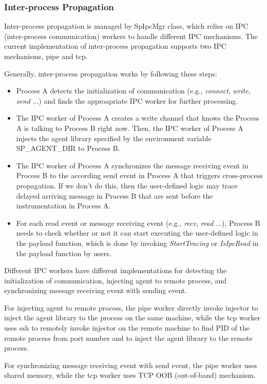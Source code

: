 \subsubsection{Inter-process Propagation}
Inter-process propagation is managed by SpIpcMgr class, which relies on IPC
(inter-process communication) workers to handle different IPC mechanisms.  The
current implementation of inter-process propagation supports two IPC mechanisms,
pipe and tcp.

Generally, inter-process propagation works by following these steps:
\begin{itemize}
\item Process A detects the initialization of communication (e.g., {\em
    connect}, {\em write}, {\em send} ...) and finds the approapriate IPC worker
  for further processing.
\item The IPC worker of Process A creates a write channel that knows the Process
  A is talking to Process B right now. Then, the IPC worker of Process A injects
  the agent library specified by the environment variable SP\_AGENT\_DIR to
  Process B.
\item The IPC worker of Process A synchronizes the message receiving event in
  Process B to the according send event in Process A that triggers cross-process
  propagation. If we don't do this, then the user-defined logic may trace
  delayed arriving message in Process B that are sent before the instrumentation
  in Process A.
\item For each read event or message receiving event (e.g., {\em recv}, {\em
    read} ...), Process B needs to check whether or not it can start executing
  the user-defined logic in the payload function, which is done by invoking {\em
    StartTracing} or {\em IsIpcRead} in the payload function by users.
\end{itemize}

Different IPC workers have different implementations for detecting the
initialization of communication, injecting agent to remote process, and
synchronizing message receiving event with sending event.

For injecting agent to remote process, the pipe worker directly invoke injector
to inject the agent library to the process on the same machine, while the tcp
worker uses ssh to remotely invoke injector on the remote machine to find PID of
the remote process from port number and to inject the agent library to the
remote process.

For synchronizing message receiving event with send event, the pipe worker uses
shared memory, while the tcp worker uses TCP OOB (out-of-band) mechanism.

